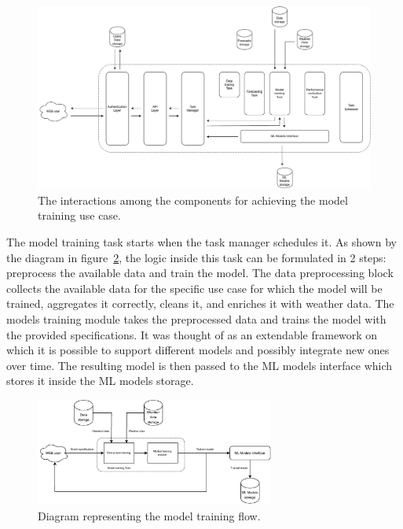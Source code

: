 \begin{figure}[H]
\centering
\includegraphics[width=1\textwidth]{images/architecture_training_interactions}
\caption{The interactions among the components for achieving the model training use case.}
\label{fig:traininginteractions}
\end{figure}

The model training task starts when the task manager schedules it.
As shown by the diagram in figure~\ref{fig:trainingflow}, the logic inside this task can be formulated in 2 steps: preprocess the available data and train the model.
The data preprocessing block collects the available data for the specific use case for which the model will be trained, aggregates it correctly, cleans it, and enriches it with weather data.
The models training module takes the preprocessed data and trains the model with the provided specifications.
It was thought of as an extendable framework on which it is possible to support different models and possibly integrate new ones over time.
The resulting model is then passed to the ML models interface which stores it inside the ML models storage.

\begin{figure}[H]
\centering
\includegraphics[width=0.7\textwidth]{images/architecture_training_flow}
\caption{Diagram representing the model training flow.}
\label{fig:trainingflow}
\end{figure}

